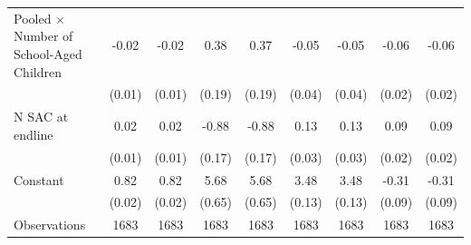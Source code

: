 \begin{table}[htbp]
\begin{tabular}{l*{8}{c}}
Pooled $\times$ Number of School-Aged Children&       -0.02\sym{***}&       -0.02\sym{***}&        0.38\sym{**} &        0.37\sym{**} &       -0.05         &       -0.05         &       -0.06\sym{**} &       -0.06\sym{**} \\
                    &      (0.01)         &      (0.01)         &      (0.19)         &      (0.19)         &      (0.04)         &      (0.04)         &      (0.02)         &      (0.02)         \\\addlinespace
N SAC at endline    &        0.02\sym{***}&        0.02\sym{***}&       -0.88\sym{***}&       -0.88\sym{***}&        0.13\sym{***}&        0.13\sym{***}&        0.09\sym{***}&        0.09\sym{***}\\
                    &      (0.01)         &      (0.01)         &      (0.17)         &      (0.17)         &      (0.03)         &      (0.03)         &      (0.02)         &      (0.02)         \\\addlinespace
Constant            &        0.82\sym{***}&        0.82\sym{***}&        5.68\sym{***}&        5.68\sym{***}&        3.48\sym{***}&        3.48\sym{***}&       -0.31\sym{***}&       -0.31\sym{***}\\
                    &      (0.02)         &      (0.02)         &      (0.65)         &      (0.65)         &      (0.13)         &      (0.13)         &      (0.09)         &      (0.09)         \\
\midrule
Observations        &        1683         &        1683         &        1683         &        1683         &        1683         &        1683         &        1683         &        1683         \\
\bottomrule
\end{tabular}
\end{table}
